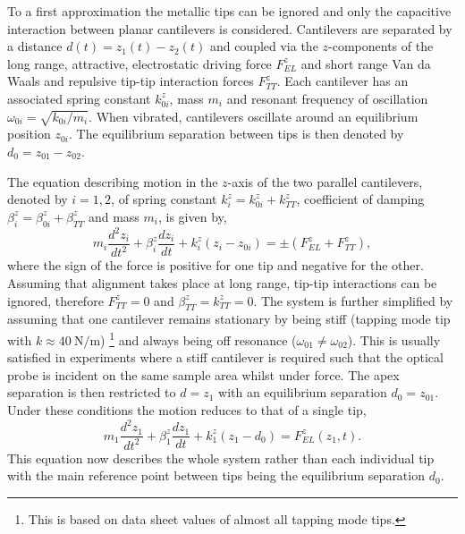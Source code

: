\documentclass{article}
\begin{document}
To a first approximation the metallic tips can be ignored and only the capacitive interaction between planar cantilevers is considered. Cantilevers are separated by a distance $d(t) = z_1(t) - z_2(t)$ and coupled via the $z$-components of the long range, attractive, electrostatic driving force $F_{EL}^z$ and short range  Van da Waals and repulsive tip-tip interaction forces $F_{TT}^z$. Each cantilever has an associated spring constant $k_{0i}^z$, mass $m_i$ and resonant frequency of oscillation $\omega_{0i} = \sqrt{k_{0i}/m_i}$. When vibrated, cantilevers oscillate around an equilibrium position $z_{0i}$. The equilibrium separation between tips is then denoted by $d_0 = z_{01} - z_{02}$.

The equation describing motion in the $z$-axis of the two parallel cantilevers, denoted by $i=1,2$, of spring constant $k_i^z=k_{0i}^z+k_{TT}^z$, coefficient of damping $\beta_i^z=\beta_{0i}^z+\beta_{TT}^z$ and mass $m_i$, is given by,
\begin{equation}
	m_i\frac{d^2z_i}{dt^2}+\beta_i^z\frac{dz_i}{dt}+k_i^z\left(z_i-z_{0i}\right)=\pm\left(F_{EL}^z+F_{TT}^z\right),
\end{equation}
where the sign of the force is positive for one tip and negative for the other.
Assuming that alignment takes place at long range, tip-tip interactions can be ignored, therefore $F_{TT}^z = 0$ and $\beta_{TT}^{z} = k_{TT}^{z} = 0$. The system is further simplified by assuming that one cantilever remains stationary by being stiff (tapping mode tip with $k\approx\SI{40}{\newton\per\metre}$)%
\footnote{This is based on data sheet values of almost all tapping mode tips.}
and always being off resonance ($\omega_{01} \neq \omega_{02}$). This is usually satisfied in experiments where a stiff cantilever is required such that the optical probe is incident on the same sample area whilst under force. The apex separation is then restricted to $d=z_1$ with an equilibrium separation $d_0 = z_{01}$. Under these conditions the motion reduces to that of a single tip,
\begin{equation}
	m_1\frac{d^2z_1}{dt^2}+\beta_1^z\frac{dz_1}{dt}+k_1^z\left(z_1-d_0\right) = F_{EL}^z(z_1, t).
	\label{eq:simple_eom}
\end{equation}
This equation now describes the whole system rather than each individual tip with the main reference point between tips being the equilibrium separation $d_0$.
\end{document}
